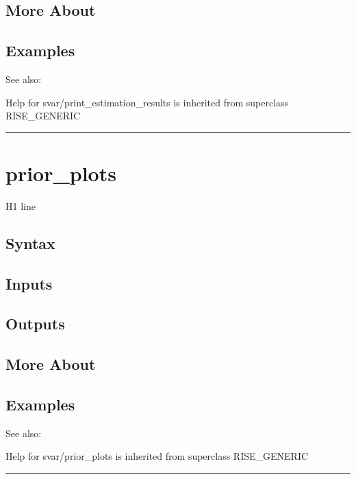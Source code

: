 \documentclass[letterpaper,10pt,english]{sphinxmanual}
\begin{document}
\subsection{More About}
\label{classes/models/@svar/svar:id89}

\subsection{Examples}
\label{classes/models/@svar/svar:id90}
See also:

Help for svar/print\_estimation\_results is inherited from superclass RISE\_GENERIC


\bigskip\hrule{}\bigskip



\section{prior\_plots}
\label{classes/models/@svar/svar:id91}\label{classes/models/@svar/svar:prior-plots}
H1 line


\subsection{Syntax}
\label{classes/models/@svar/svar:id92}

\subsection{Inputs}
\label{classes/models/@svar/svar:id93}

\subsection{Outputs}
\label{classes/models/@svar/svar:id94}

\subsection{More About}
\label{classes/models/@svar/svar:id95}

\subsection{Examples}
\label{classes/models/@svar/svar:id96}
See also:

Help for svar/prior\_plots is inherited from superclass RISE\_GENERIC


\bigskip\hrule{}\bigskip
\end{document}
